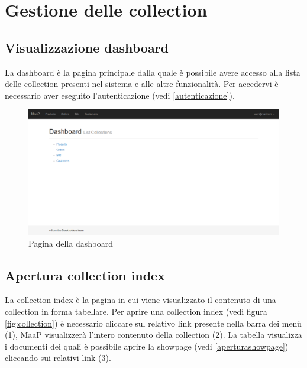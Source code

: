 \section{Gestione delle collection}

	\subsection{Visualizzazione dashboard} %
	\label{visualizzazionedashboard}
	La dashboard è la pagina principale dalla quale è possibile avere accesso alla lista delle collection presenti nel sistema e alle altre funzionalità. Per accedervi è necessario aver eseguito l'autenticazione (vedi \ref{autenticazione}).

	\begin{figure}[H]
	\label{fig:dashboard}
		\centering \includegraphics[width=1\textwidth]{img/dashboard.png}
	\caption{Pagina della dashboard}
	\end{figure}
	

	\subsection{Apertura collection index} %
	\label{aperturacollectionindex}
	La collection index è la pagina in cui viene visualizzato il contenuto di una collection in forma tabellare. Per aprire una collection index (vedi figura \ref{fig:collection}) è necessario cliccare sul relativo link presente nella barra dei menù (1), MaaP visualizzerà l'intero contenuto della collection (2). La tabella visualizza i documenti dei quali è possibile aprire la showpage (vedi \ref{aperturashowpage}) cliccando sui relativi link (3). %


